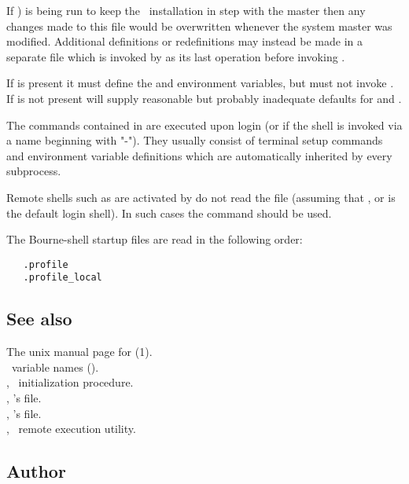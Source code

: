 If ) is being run to keep the \aipspp\ installation in step
with the master then any changes made to this file would be overwritten
whenever the system master was modified.  Additional definitions or
redefinitions may instead be made in a separate  file
which is invoked by  as its last operation before invoking
.


If  is present it must define the  and
 environment variables, but must not invoke .
If  is not present  will supply
reasonable but probably inadequate defaults for  and .

The commands contained in  are executed upon login (or if the
shell is invoked via a name beginning with "-").  They usually consist of
terminal setup commands and environment variable definitions which are
automatically inherited by every subprocess.

Remote shells such as are activated by  do not read the
 file (assuming that ,  or
 is the default login shell).  In such cases the
 command should be used.

The Bourne-shell startup files are read in the following order:

\begin{verbatim}
   .profile
   .profile_local
\end{verbatim}

\subsection*{See also}

The unix manual page for (1).\\
\aipspp\ variable names ().\\
, \aipspp\ initialization procedure.\\
, 's  file.\\
, 's  file.\\
, \aipspp\ remote execution utility.

\subsection*{Author}

